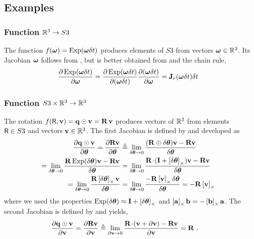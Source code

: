 \subsection{Examples}

\subsubsection{Function $\bbR^3\to S3$} 
\label{sec:jac_R3toSO3}

The function $f(\bw) = \Exp(\bw\dt)$ produces elements of $S3$ from vectors $\bw\in\bbR^3$. 
Its Jacobian \wrt $\bw$ follows from , but is better obtained from  and the chain rule,
%
\begin{align*}
\dpar{\Exp(\bw\dt)}{\bw}
= \dpar{\Exp(\bw\dt)}{(\bw\dt)}\dpar{(\bw\dt)}{\bw} 
= \bfJ_r(\bw\dt)\dt
\end{align*}
%


\subsubsection{Function $S3\times\bbR^3\to\bbR^3$} 
\label{sec:jac_SO3xR3toR3}

The rotation $f(\sR,\bfv) = \bfq\od\bfv = \bfR\,\bfv$ produces vectors of $\bbR^3$ from elements $\sR\in S3$ and vectors $\bfv\in\bbR^3$. The first Jacobian is defined by  and developed as
%
\begin{align*}
\dpar{\bfq\od\bfv}{\bth} = \dpar{\bfR\bfv}{\bth} 
&\te \lim_{\delta\bth\to0}\frac{(\bfR\oplus\delta\bth)\bfv-\bfR\bfv}{\delta\bth} \\
= \lim_{\delta\bth\to0}\frac{\bfR\Exp(\delta\bth)\bfv-\bfR\bfv}{\delta\bth} 
&= \lim_{\delta\bth\to0}\frac{\bfR\tdot(\bfI+\hatx{\delta\bth})\bfv-\bfR\bfv}{\delta\bth} \\
= \lim_{\delta\bth\to0}\frac{\bfR\hatx{\delta\bth}\bfv}{\delta\bth} 
&= \lim_{\delta\bth\to0}\frac{-\bfR\hatx{\bfv}\delta\bth}{\delta\bth} 
= -\bfR\hatx{\bfv} 
\end{align*}
%
where we used the properties $\Exp(\dth) \approx \bfI + \hatx{\dth}$ and  $\hatx{\bfa}\bfb = -\hatx{\bfb}\bfa$. 
The second Jacobian is defined by  and yields,
%
\begin{align*}
\dpar{\bfq\od\bfv}{\bfv} = \dpar{\bfR\bfv}{\bfv} 
&\te \lim_{\partial\bfv\to0}\frac{\bfR\tdot(\bfv+\partial\bfv)-\bfR\bfv}{\partial\bfv} 
= \bfR
~.
\end{align*}





